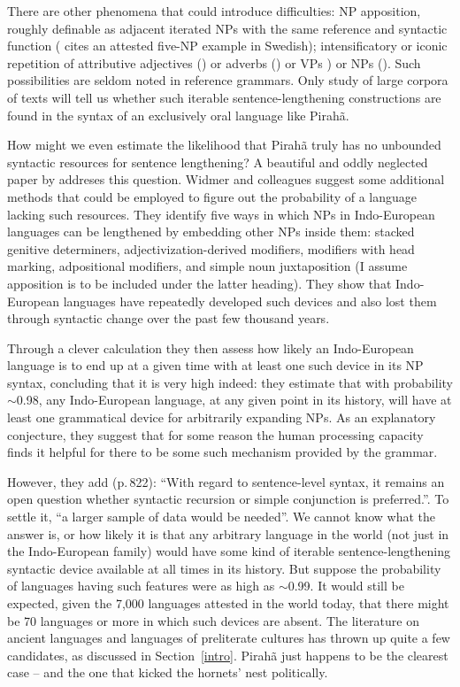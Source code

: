 \documentclass[output=paper,colorlinks,citecolor=brown
]{langscibook}
\begin{document}
There are other phenomena that could introduce difficulties: NP
apposition, roughly definable as adjacent iterated NPs with the same
reference and syntactic function (\citealt{Karlsson10} cites an
attested five-NP example in Swedish); intensificatory or iconic
repetition of attributive adjectives ()
or adverbs () or VPs ) or NPs (). Such possibilities are seldom noted
in reference grammars. Only study of large corpora of texts will tell
us whether such iterable sentence-lengthening constructions are found
in the syntax of an exclusively oral language like Pirah{\~a}.

How might we even estimate the likelihood that Pirah{\~a} truly has no
unbounded syntactic resources for sentence lengthening? A beautiful
and oddly neglected paper by \citet{WidmerEtAl17} addreses this
question. Widmer and colleagues suggest some additional methods that
could be employed to figure out the probability of a language lacking
such resources. They identify five ways in which NPs in Indo-European
languages can be lengthened by embedding other NPs inside them: stacked
genitive determiners, adjectivization-derived modifiers, modifiers
with head marking, adpositional modifiers, and simple noun
juxtaposition (I assume apposition is to be included under the latter
heading). They show that Indo-European languages have repeatedly
developed such devices and also lost them through syntactic change
over the past few thousand years.

Through a clever calculation they then assess how likely an Indo-European
language is to end up at a given time with at least one such device in
its NP syntax, concluding that it is very high indeed: they estimate
that with probability $\sim$0.98, any Indo-European language, at any
given point in its history, will have at least one grammatical device
for arbitrarily expanding NPs. As an explanatory conjecture, they suggest
that for some reason the human processing capacity finds it helpful for
there to be some such mechanism provided by the grammar.

However, they add (p.\,822): ``With regard to sentence-level syntax,
it remains an open question whether syntactic recursion or simple
conjunction is preferred.''. To settle it, ``a larger sample of data
would be needed''. We cannot know what the answer is, or how likely
it is that any arbitrary language in the world (not just in the
Indo-European family) would have some kind of iterable
sentence-lengthening syntactic device available at all times in its
history. But suppose the probability of languages having such features
were as high as $\sim$0.99. It would still be expected, given the
7,000 languages attested in the world today, that there might be 70
languages or more in which such devices are absent. The literature
on ancient languages and languages of preliterate cultures has thrown
up quite a few candidates, as discussed in Section~\ref{intro}.
Pirah{\~a} just happens to be the clearest case -- and the one that
kicked the hornets' nest politically.
\end{document}
